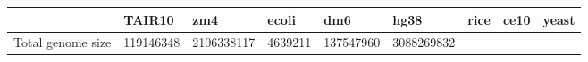 \documentclass[]{article}
\begin{document}
\begin{longtable}[]{@{}lllllllll@{}}
\toprule
\begin{minipage}[b]{0.16\columnwidth}\raggedright\strut
\strut
\end{minipage} & \begin{minipage}[b]{0.07\columnwidth}\raggedright\strut
TAIR10\strut
\end{minipage} & \begin{minipage}[b]{0.07\columnwidth}\raggedright\strut
zm4\strut
\end{minipage} & \begin{minipage}[b]{0.07\columnwidth}\raggedright\strut
ecoli\strut
\end{minipage} & \begin{minipage}[b]{0.08\columnwidth}\raggedright\strut
dm6\strut
\end{minipage} & \begin{minipage}[b]{0.08\columnwidth}\raggedright\strut
hg38\strut
\end{minipage} & \begin{minipage}[b]{0.07\columnwidth}\raggedright\strut
rice\strut
\end{minipage} & \begin{minipage}[b]{0.07\columnwidth}\raggedright\strut
ce10\strut
\end{minipage} & \begin{minipage}[b]{0.07\columnwidth}\raggedright\strut
yeast\strut
\end{minipage}\tabularnewline
\midrule
\endhead
\begin{minipage}[t]{0.16\columnwidth}\raggedright\strut
Total genome size\strut
\end{minipage} & \begin{minipage}[t]{0.07\columnwidth}\raggedright\strut
119146348\strut
\end{minipage} & \begin{minipage}[t]{0.07\columnwidth}\raggedright\strut
2106338117\strut
\end{minipage} & \begin{minipage}[t]{0.07\columnwidth}\raggedright\strut
4639211\strut
\end{minipage} & \begin{minipage}[t]{0.08\columnwidth}\raggedright\strut
137547960\strut
\end{minipage} & \begin{minipage}[t]{0.08\columnwidth}\raggedright\strut
3088269832\strut
\end{minipage} & \begin{minipage}[t]{0.07\columnwidth}\raggedright\strut

\end{minipage}
\end{longtable}
\end{document}
